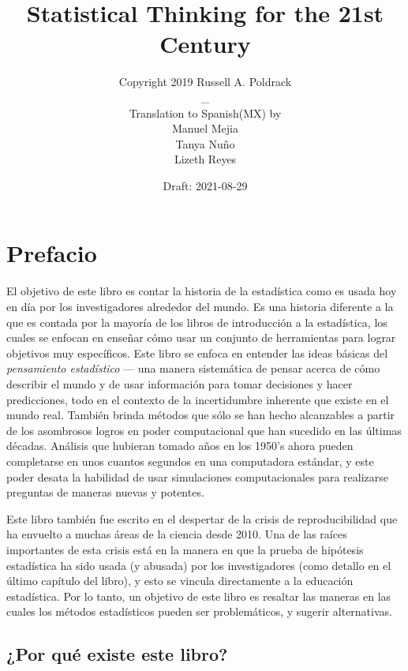 \documentclass[
  12pt,
]{book}
\title{Statistical Thinking for the 21st Century}
\author{Copyright 2019 Russell A. Poldrack\\
\_\\
Translation to Spanish(MX) by\\
Manuel Mejia\\
Tanya Nuño\\
Lizeth Reyes}
\date{Draft: 2021-08-29}
\begin{document}
\maketitle

{
\hypersetup{linkcolor=}
\setcounter{tocdepth}{1}
\tableofcontents
}
\hypertarget{prefacio}{%
\chapter*{Prefacio}\label{prefacio}}

El objetivo de este libro es contar la historia de la estadística como es usada hoy en día por los investigadores alrededor del mundo. Es una historia diferente a la que es contada por la mayoría de los libros de introducción a la estadística, los cuales se enfocan en enseñar cómo usar un conjunto de herramientas para lograr objetivos muy específicos. Este libro se enfoca en entender las ideas básicas del \emph{pensamiento estadístico} --- una manera sistemática de pensar acerca de cómo describir el mundo y de usar información para tomar decisiones y hacer predicciones, todo en el contexto de la incertidumbre inherente que existe en el mundo real. También brinda métodos que sólo se han hecho alcanzables a partir de los asombrosos logros en poder computacional que han sucedido en las últimas décadas. Análisis que hubieran tomado años en los 1950's ahora pueden completarse en unos cuantos segundos en una computadora estándar, y este poder desata la habilidad de usar simulaciones computacionales para realizarse preguntas de maneras nuevas y potentes.

Este libro también fue escrito en el despertar de la crisis de reproducibilidad que ha envuelto a muchas áreas de la ciencia desde 2010. Una de las raíces importantes de esta crisis está en la manera en que la prueba de hipótesis estadística ha sido usada (y abusada) por los investigadores (como detallo en el último capítulo del libro), y esto se vincula directamente a la educación estadística. Por lo tanto, un objetivo de este libro es resaltar las maneras en las cuales los métodos estadísticos pueden ser problemáticos, y sugerir alternativas.

\hypertarget{por-quuxe9-existe-este-libro}{%
\section{¿Por qué existe este libro?}\label{por-quuxe9-existe-este-libro}}
\end{document}
